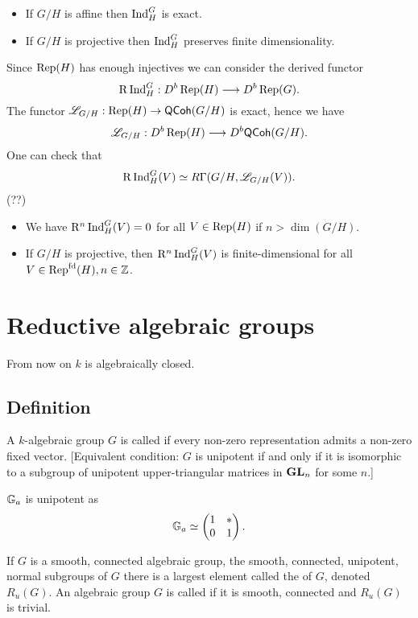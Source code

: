 \begin{consequences} \leavevmode
\begin{itemize}
	\item If $G /H$ is affine then $\operatorname{Ind}_{H}^{G}$ is exact.
	\item If $G /H$ is projective then $\operatorname{Ind}_{H}^{G}$ preserves finite dimensionality.
\end{itemize}
\end{consequences}

Since $\operatorname{Rep}(H)$ has enough injectives we can consider the derived functor
\[
	\RD\Ind_H^{G}:D^{b}\Rep(H)\to D^{b}\Rep(G).
\]
The functor $\CL_{G /H}:\Rep(H)\to \cat{QCoh}(G /H)$ is exact, hence we have 
\[
	\CL_{G /H}:D^{b}\Rep(H)\to D^{b}\cat{QCoh}(G /H).
\]
One can check that
\[
\mathrm{R}\operatorname{Ind}_H^{G}(V) \simeq R\Gamma(G /H, \mathscr{L}_{G /H}(V)).
\] 
(??)

\begin{consequences} \leavevmode
\begin{itemize}
	\item We have $\mathrm{R}^{n}\operatorname{Ind}_H^{G}(V)=0$ for all $V\in \operatorname{Rep}(H)$ if $n>\dim(G /H)$.
	\item If $G /H$ is projective, then $\mathrm{R}^{n}\operatorname{Ind}_H^{G}(V)$ is finite-dimensional for all $V\in \operatorname{Rep}^{\text{fd}}(H), n\in \mathbb Z$.
\end{itemize}
\end{consequences}

\newpage

\section{Reductive algebraic groups}
From now on $k$ is algebraically closed.

\subsection{Definition}
A $k$-algebraic group $G$ is called  if every non-zero representation admits a non-zero fixed vector. [Equivalent condition: $G$ is unipotent if and only if it is isomorphic to a subgroup of unipotent upper-triangular matrices in $\mathbf{GL}_n$ for some $n$.]
\begin{example}
	$\mathbb{G}_a$ is unipotent as
	\[
		\mathbb{G}_a \simeq \begin{pmatrix} 1 & * \\ 0 & 1 \end{pmatrix} .
	\] 
\end{example}
If $G$ is a smooth, connected algebraic group, the smooth, connected, unipotent, normal subgroups of $G$ there is a largest element called the  of $G$, denoted $R_u(G)$. An algebraic group $G$ is called  if it is smooth, connected and $R_u(G)$ is trivial. 

